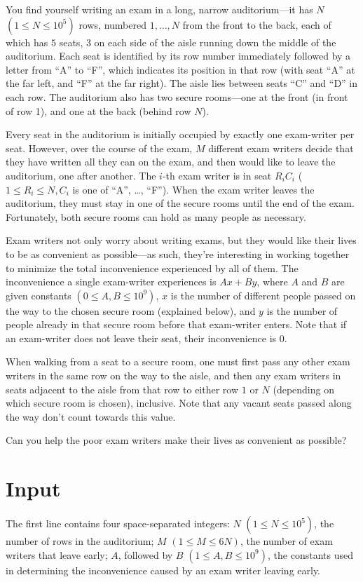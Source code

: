 
You find yourself writing an exam in a long, narrow auditorium---it has $N$ $(1 \leq N \leq 10^5)$
rows, numbered $1, \ldots, N$ from the front to the back, each of which has $5$ seats, $3$ on each side
of the aisle running down the middle of the auditorium. Each seat is identified by its row number
immediately followed by a letter from ``A'' to ``F'', which indicates its position in that row (with
seat ``A'' at the far left, and ``F'' at the far right). The aisle lies between seats ``C'' and ``D'' in
each row. The auditorium also has two secure rooms---one at the front (in front of row 1), and one
at the back (behind row $N$).

Every seat in the auditorium is initially occupied by exactly one exam-writer per seat. However,
over the course of the exam, $M$ different exam writers decide that they have written all they can
on the exam, and then would like to leave the auditorium, one after another. The $i$-th exam writer
is in seat $R_iC_i$ ($1 \leq R_i \leq N, C_i$ is one of ``A'', \ldots, ``F''). When the exam writer leaves
the auditorium, they must stay in one of the secure rooms until the end of the exam. Fortunately,
both secure rooms can hold as many people as necessary.

Exam writers not only worry about writing exams, but they would like their lives to be as convenient
as possible---as such, they're interesting in working together to minimize the total inconvenience
experienced by all of them. The inconvenience a single exam-writer experiences is $Ax+By$, where $A$
and $B$ are given constants $(0 \leq A,B \leq 10^9)$, $x$ is the number of different people passed
on the way to the chosen secure room (explained below), and $y$ is the number of people already in
that secure room before that exam-writer enters. Note that if an exam-writer does not leave their
seat, their inconvenience is $0$.

When walking from a seat to a secure room, one must first pass any other exam writers in the same
row on the way to the aisle, and then any exam writers in seats adjacent to the aisle from that row
to either row $1$ or $N$ (depending on which secure room is chosen), inclusive. Note that any vacant
seats passed along the way don't count towards this value.

Can you help the poor exam writers make their lives as convenient as possible?

\section*{Input}
The first line contains four space-separated integers: $N$ $(1 \leq N \leq 10^5)$, the number of rows
in the auditorium; $M$ $(1 \leq M \leq 6N)$, the number of exam writers that leave early; $A$,
followed by $B$ $(1 \leq A,B \leq 10^9)$, the constants used in determining the inconvenience caused
by an exam writer leaving early.

